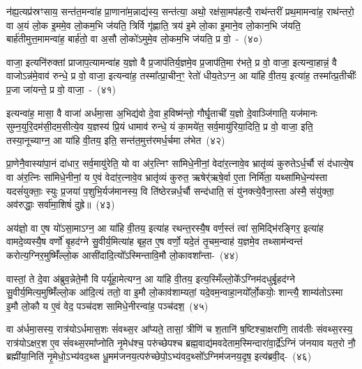 न॑ह्य॒त्यप्र॑स्रꣳसाय॒ सन्त॑त॒मन्वा॑ह प्रा॒णाना॑म॒न्नाद्य॑स्य॒ सन्त॑त्या॒ अथो॒ रक्ष॑सा॒मप॑हत्यै॒ राथ॑न्तरीं प्रथ॒मामन्वा॑ह॒ राथ॑न्तरो॒ वा अ॒यं लो॒क इ॒ममे॒व लो॒कम॒भि ज॑यति॒ त्रिर्वि गृ॑ह्णाति॒ त्रय॑ इ॒मे लो॒का इ॒माने॒व लो॒कान॒भि ज॑यति॒ बार्\mbox{}ह॑तीमुत्त॒मामन्वा॑ह॒ बार्\mbox{}ह॑तो॒ वा अ॒सौ लो॒को॑\-ऽमुमे॒व लो॒कम॒भि ज॑यति॒ प्र वो॒~-~(४०)\ip

वाजा॒ इत्यनि॑रुक्तां प्राजाप॒त्यामन्वा॑ह य॒ज्ञो वै प्र॒जा\-प॑तिर्य॒ज्ञमे॒व प्र॒जा\-प॑ति॒मा र॑भते॒ प्र वो॒ वाजा॒ इत्यन्वा॒हान्नं॒ वै वाजो\-ऽन्न॑मे॒वाव॑ रुन्धे॒ प्र वो॒ वाजा॒ इत्यन्वा॑ह॒ तस्मा᳚त्प्रा॒चीन॒ꣳ॒ रेतो॑ धीय॒ते\-ऽग्न॒ आ या॑हि वी॒तय॒ इत्या॑ह॒ तस्मा᳚त्प्र॒तीचीः᳚ प्र॒जा जा॑यन्ते॒ प्र वो॒ वाजा॒~-~(४१)\ip

इत्यन्वा॑ह॒ मासा॒ वै वाजा॑ अर्धमा॒सा अ॒भिद्य॑वो दे॒वा ह॒विष्म॑न्तो॒ गौर्घृ॒ताची॑ य॒ज्ञो दे॒वाञ्जि॑गाति॒ यज॑मानः सुम्न॒युरि॒दम॑सी॒दम॒सीत्ये॒व य॒ज्ञस्य॑ प्रि॒यं धामाव॑ रुन्धे॒ यं का॒मये॑त॒ सर्व॒मायु॑रिया॒दिति॒ प्र वो॒ वाजा॒ इति॒ तस्या॒नूच्याग्न॒ आ या॑हि वी॒तय॒ इति॒ सन्त॑त॒मुत्त॑रमर्ध॒र्चमा ल॑भेत~(४२)\ip

प्रा॒णेनै॒वास्या॑पा॒नं दा॑धार॒ सर्व॒मायु॑रेति॒ यो वा अ॑र॒त्निꣳ सा॑मिधे॒नीनां॒ वेदा॑र॒त्नावे॒व भ्रातृ॑व्यं कुरुते\-ऽर्ध॒र्चौ सं द॑धात्ये॒ष वा अ॑र॒त्निः सा॑मिधे॒नीनां॒ य ए॒वं वेदा॑र॒त्नावे॒व भ्रातृ॑व्यं कुरुत॒ ऋषेर्॑\mbox{}ऋषे॒र्वा ए॒ता निर्मि॑ता॒ यथ्सा॑मिधे॒न्य॑स्ता यदसं॑युक्ताः॒ स्युः प्र॒जया॑ प॒शुभि॒र्यज॑मानस्य॒ वि ति॑ष्ठेरन्नर्ध॒र्चौ सन्द॑धाति॒ सं यु॑नक्त्ये॒वैना॒स्ता अ॑स्मै॒ संयु॑क्ता॒ अव॑रुद्धाः॒ सर्वा॑मा॒शिषं॑ दुह्रे॥~(४३)\ip


{\anuvakamend[{ब॒र्॒\mbox{}सं वो॑ जायन्ते॒ प्र वो॒ वाजा॑ लभेत दधाति॒ सन्दश॑ च}]}

अय॑ज्ञो॒ वा ए॒ष यो॑\-ऽसा॒मा\-ऽग्न॒ आ या॑हि वी॒तय॒ इत्या॑ह रथन्त॒रस्यै॒ष वर्ण॒स्तं त्वा॑ स॒मिद्भि॑रङ्गिर॒ इत्या॑ह वामदे॒व्यस्यै॒ष वर्णो॑ बृ॒हद॑ग्ने सु॒वीर्य॒मित्या॑ह बृह॒त ए॒ष वर्णो॒ यदे॒तं तृ॒चम॒न्वाह॑ य॒ज्ञमे॒व तथ्साम॑न्वन्तं करोत्य॒ग्निर॒मुष्मिँ॑ल्लो॒क आसी॑दादि॒त्यो᳚\-ऽस्मिन्तावि॒मौ लो॒कावशा᳚न्ता-~(४४)\ip

वास्तां॒ ते दे॒वा अ॑ब्रुव॒न्नेते॒मौ वि पर्यू॑हा॒मेत्यग्न॒ आ या॑हि वी॒तय॒ इत्य॒स्मिँल्लो॒के᳚\-ऽग्निम॑दधुर्बृ॒हद॑ग्ने सु॒वीर्य॒मित्य॒मुष्मिँ॑ल्लो॒क आ॑दि॒त्यं ततो॒ वा इ॒मौ लो॒काव॑शाम्यतां॒ यदे॒वम॒न्वाहा॒नयो᳚र्लो॒कयोः॒ शान्त्यै॒ शाम्य॑तो\-ऽस्मा इ॒मौ लो॒कौ य ए॒वं वेद॒ पञ्च॑दश सामिधे॒नीरन्वा॑ह॒ पञ्च॑दश॒~(४५)\ip

वा अ॑र्धमा॒सस्य॒ रात्र॑यो\-ऽर्धमास॒शः सं॑वथ्स॒र आ᳚प्यते॒ तासां॒ त्रीणि॑ च श॒तानि॑ ष॒ष्टिश्चा॒क्षरा॑णि॒ ताव॑तीः संवथ्स॒रस्य॒ रात्र॑यो\-ऽक्षर॒श ए॒व सं॑वथ्स॒रमा᳚प्नोति नृ॒मेध॑श्च॒ परु॑च्छेपश्च ब्रह्म॒वाद्य॑मवदेताम॒स्मिन्दारा॑वा॒र्द्रे᳚\-ऽग्निं ज॑नयाव यत॒रो नौ॒ ब्रह्मी॑या॒निति॑ नृ॒मेधो॒\-ऽभ्य॑वद॒थ्स धू॒मम॑जनय॒त्परु॑च्छेपो॒\-ऽभ्य॑वद॒थ्सो᳚\-ऽग्निम॑जनय॒दृष॒ इत्य॑ब्रवी॒द्-~(४६)\ip

